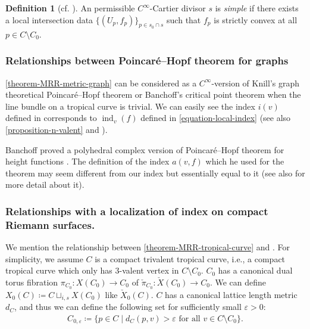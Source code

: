 \documentclass[a4paper,dvipdfmx,reqno,12pt]{amsart}
\theoremstyle{definition}
\newtheorem{definition}[theorem]{Definition}
\newcommand{\deq}{\coloneqq}
\newcommand{\vep}{\varepsilon}%
\newcommand{\opn}[1]{\operatorname{#1}}
\numberwithin{equation}{section}
\begin{document}
\begin{definition}[{cf. \cite{auroux2022lagrangian}}]
An permissible $C^{\infty}$-Cartier divisor $s$ is 
\emph{simple} if there exists a local intersection data
$\{(U_p,f_p)\}_{p\in s_0\cap s}$ such that
$f_p$ is strictly convex at all $p\in C\setminus C_0$.
\end{definition}

\subsubsection{Relationships between 
Poincar\'e--Hopf theorem for graphs}

\cref{theorem-MRR-metric-graph} can be considered 
as a $C^{\infty}$-version of Knill's graph 
theoretical Poincar\'e--Hopf theorem \cite{knill2012graph}
or 
Banchoff's critical point theorem \cite{MR225327}
when the line bundle on a tropical curve is trivial.
We can easily see the index $i(v)$ defined in 
\cite[]{knill2012graph}
corresponds to $\opn{ind}_v(f)$ defined in 
\cref{equation-local-index} (see also 
\cref{proposition-n-valent} and 
\cite[]{knill2012graph}).

Banchoff proved a polyhedral complex version of Poincar\'e--Hopf theorem
for height functions \cite[Theorem 1]{MR225327}.
The definition of the index $a(v,f)$ 
\cite[p.246]{MR225327} which 
he used for the theorem may seem different 
from our index but essentially equal to it
(see also \cite[p.143-144]{grunert2017piecewise} 
for more detail about it).





\subsubsection{Relationships with a localization of 
index on compact Riemann surfaces.}

We mention the relationship between 
\cref{theorem-MRR-tropical-curve} and
\cite[6]{MR2676658}.
For simplicity,
we assume $C$ is a compact trivalent tropical curve, i.e.,
a compact tropical curve which only has $3$-valent
vertex in $C\setminus C_0$.  
$C_0$ has a canonical dual torus fibration 
$\pi_{C_0}\colon X(C_0)\to C_0$ of
$\check{\pi}_{C_0} \colon \check{X}(C_0)\to C_0$.
We can define $X_0(C)\deq C\sqcup_{i,s} X(C_0)$ like
$\check{X}_0(C)$.
$C$ has a canonical lattice length metric $d_{C}$, and
thus we can define the following set for sufficiently small
$\vep >0$: 
\begin{align}
C_{0,\vep}\deq \{p\in C\mid d_C(p,v)>\vep 
\text{ for all } v\in C\setminus C_0\}.
\end{align}
\end{document}
